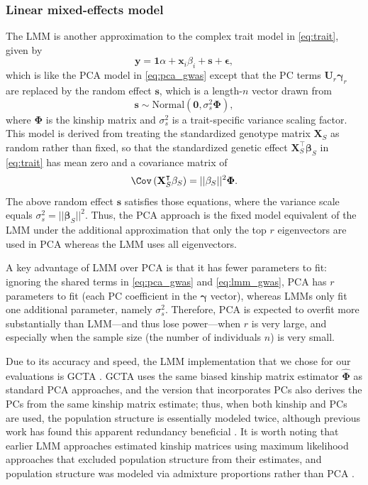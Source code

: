 \documentclass[11pt]{article}
\begin{document}
\subsubsection{Linear mixed-effects model}

The LMM is another approximation to the complex trait model in \cref{eq:trait}, given by
\begin{equation}
  \label{eq:lmm_gwas}
  \mathbf{y}
  =
  \mathbf{1} \alpha + \mathbf{x}_i \beta_i + \mathbf{s} + \mathbf{\epsilon}
  ,
\end{equation}
which is like the PCA model in \cref{eq:pca_gwas} except that the PC terms $\mathbf{U}_r \mathbf{\gamma}_r$ are replaced by the random effect $\mathbf{s}$, which is a length-$n$ vector drawn from
$$
\mathbf{s} \sim \text{Normal} \left( \mathbf{0}, \sigma^2_s \mathbf{\Phi} \right),
$$
where $\mathbf{\Phi}$ is the kinship matrix and $\sigma^2_s$ is a trait-specific variance scaling factor.
This model is derived from treating the standardized genotype matrix $\mathbf{X}_S$ as random rather than fixed, so that the standardized genetic effect
$\mathbf{X}_S^\intercal \mathbf{\beta}_S$
in \cref{eq:trait} has mean zero and a covariance matrix of
$$
\Cov \left( \mathbf{X}_S^\intercal \mathbf{\beta}_S \right)
=
|| \mathbf{\beta}_S ||^2 \mathbf{\Phi}
.
$$
The above random effect $\mathbf{s}$ satisfies those equations, where the variance scale equals $\sigma^2_s = || \mathbf{\beta}_S ||^2$.
Thus, the PCA approach is the fixed model equivalent of the LMM under the additional approximation that only the top $r$ eigenvectors are used in PCA whereas the LMM uses all eigenvectors.

A key advantage of LMM over PCA is that it has fewer parameters to fit: ignoring the shared terms in \cref{eq:pca_gwas} and \cref{eq:lmm_gwas}, PCA has $r$ parameters to fit (each PC coefficient in the $\mathbf{\gamma}$ vector), whereas LMMs only fit one additional parameter, namely $\sigma^2_s$.
Therefore, PCA is expected to overfit more substantially than LMM---and thus lose power---when $r$ is very large, and especially when the sample size (the number of individuals $n$) is very small.

Due to its accuracy and speed, the LMM implementation that we chose for our evaluations is GCTA \citep{yang_gcta:_2011}.
GCTA uses the same biased kinship matrix estimator $\mathbf{\hat{\Phi}}$ as standard PCA approaches, and the version that incorporates PCs also derives the PCs from the same kinship matrix estimate; thus, when both kinship and PCs are used, the population structure is essentially modeled twice, although previous work has found this apparent redundancy beneficial \citep{zhao_arabidopsis_2007, price_new_2010}.
It is worth noting that earlier LMM approaches estimated kinship matrices using maximum likelihood approaches that excluded population structure from their estimates, and population structure was modeled via admixture proportions rather than PCA \citep{yu_unified_2006, zhao_arabidopsis_2007}.
\end{document}
